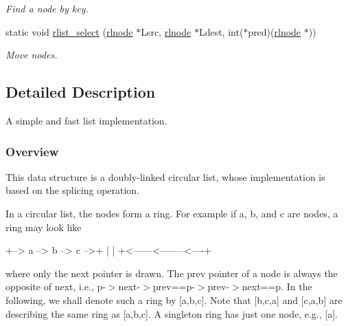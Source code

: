 \begin{DoxyCompactItemize}
\begin{DoxyCompactList}\small\item\em Find a node by key. \end{DoxyCompactList}\item 
static void \hyperlink{group__rlists_ga6016cbc055d242a03d823ebfec422c2b}{rlist\+\_\+select} (\hyperlink{group__rlists_ga8f6244877f7ce2322c90525217ea6e7a}{rlnode} $\ast$Lsrc, \hyperlink{group__rlists_ga8f6244877f7ce2322c90525217ea6e7a}{rlnode} $\ast$Ldest, int($\ast$pred)(\hyperlink{group__rlists_ga8f6244877f7ce2322c90525217ea6e7a}{rlnode} $\ast$))
\begin{DoxyCompactList}\small\item\em Move nodes. \end{DoxyCompactList}\end{DoxyCompactItemize}


\subsection{Detailed Description}
A simple and fast list implementation. 

\subsubsection*{Overview }

This data structure is a doubly-\/linked circular list, whose implementation is based on the splicing operation.

In a circular list, the nodes form a ring. For example if a, b, and c are nodes, a ring may look like \begin{DoxyVerb}+--> a --> b --> c -->+
|                     |
+<------<--------<----+
\end{DoxyVerb}
 where only the {\ttfamily next} pointer is drawn. The {\ttfamily prev} pointer of a node is always the opposite of {\ttfamily next}, i.\+e., {\ttfamily p-\/$>$next-\/$>$prev==p-\/$>$prev-\/$>$next==p}. In the following, we shall denote such a ring by \mbox{[}a,b,c\mbox{]}. Note that \mbox{[}b,c,a\mbox{]} and \mbox{[}c,a,b\mbox{]} are describing the same ring as \mbox{[}a,b,c\mbox{]}. A singleton ring has just one node, e.\+g., \mbox{[}a\mbox{]}.

